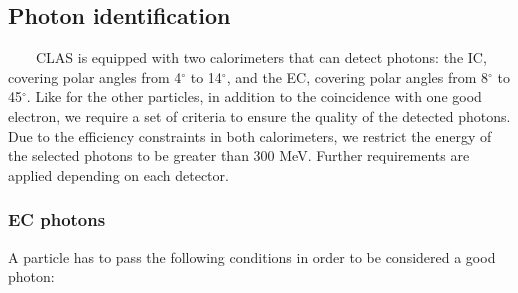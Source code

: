 \subsection{Photon identification}
~~~~CLAS is equipped with two calorimeters that can detect photons: the IC, covering polar angles from 4$^\circ$ to 14$^\circ$, and the EC, covering polar angles from 8$^\circ$ to 45$^\circ$. Like for the other particles, in addition to the coincidence with one good electron, we require a set of criteria to ensure the quality of the detected photons. Due to the efficiency constraints in both calorimeters, we restrict the energy of the selected photons to be greater than 300 MeV. Further requirements are applied depending on each detector.   

\subsubsection*{EC photons}
A particle has to pass the following conditions in order to be considered a good photon: 

